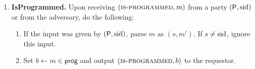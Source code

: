 \begin{cccFunctionality}
\begin{enumerate}[label=\FlatSteel, leftmargin=*, nosep]
            \item \textbf{IsProgrammed.} Upon receiving $(\textsc{is-programmed}, m)$ from a party $(\mathsf{P}, \mathrm{sid})$ or from the adversary, do the following:
                  \begin{enumerate}[label=\arabic*., leftmargin=*, nosep]
                        \item If the input was given by $(\mathsf{P}, \mathrm{sid})$, parse $m$ as $(s, m')$. If $s \neq \mathrm{sid}$, ignore this input.
                        \item Set $b \gets m \in \mathsf{prog}$ and output $(\textsc{is-programmed}, b)$ to the requestor.
                  \end{enumerate}
      \end{enumerate}
\end{cccFunctionality}